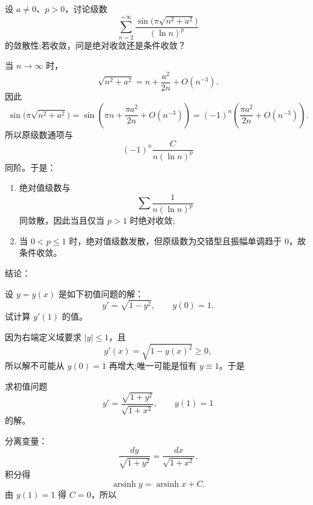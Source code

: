 \begin{question}[级数敛散性]

设 $a\ne0$、$p>0$，讨论级数
\[
\sum_{n=2}^{+\infty}\frac{\sin\bigl(\pi\sqrt{n^2+a^2}\bigr)}{(\ln n)^p}
\]
的敛散性;若收敛，问是绝对收敛还是条件收敛？

\begin{solution}

当 $n\to\infty$ 时，
\[
\sqrt{n^2+a^2}=n+\frac{a^2}{2n}+O(n^{-3}).
\]
因此
\[
\sin\bigl(\pi\sqrt{n^2+a^2}\bigr)
=\sin\left(\pi n+\frac{\pi a^2}{2n}+O(n^{-3})\right)
=(-1)^n\left(\frac{\pi a^2}{2n}+O(n^{-3})\right).
\]
所以原级数通项与
\[
(-1)^n\frac{C}{n(\ln n)^p}
\]
同阶。于是：
\begin{enumerate}[label=(\arabic*),leftmargin=2.6em,itemsep=0.25em,topsep=0.2em]
\item 绝对值级数与
\[
\sum\frac{1}{n(\ln n)^p}
\]
同敛散，因此当且仅当 $p>1$ 时绝对收敛;
\item 当 $0<p\le1$ 时，绝对值级数发散，但原级数为交错型且振幅单调趋于 $0$，故条件收敛。
\end{enumerate}
结论：

\end{solution}
\end{question}

\begin{question}[特殊初值问题]

设 $y=y(x)$ 是如下初值问题的解：
\[
 y'=\sqrt{1-y^2},\qquad y(0)=1.
\]
试计算 $y'(1)$ 的值。

\begin{solution}

因为右端定义域要求 $|y|\le1$，且
\[
 y'(x)=\sqrt{1-y(x)^2}\ge0,
\]
所以解不可能从 $y(0)=1$ 再增大;唯一可能是恒有 $y\equiv1$。于是

\end{solution}
\end{question}

\begin{question}[可分离变量微分方程]

求初值问题
\[
 y'=\frac{\sqrt{1+y^2}}{\sqrt{1+x^2}},\qquad y(1)=1
\]
的解。

\begin{solution}

分离变量：
\[
\frac{dy}{\sqrt{1+y^2}}=\frac{dx}{\sqrt{1+x^2}}.
\]
积分得
\[
\operatorname{arsinh}y=\operatorname{arsinh}x+C.
\]
由 $y(1)=1$ 得 $C=0$，所以

\end{solution}
\end{question}

\clearpage

